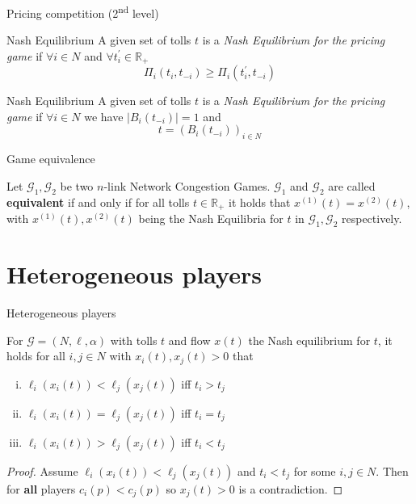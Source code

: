 \documentclass{beamer}
\newcommand{\R}{\mathbb{R}}
\newcommand{\Gm}{\mathcal{G}}
\begin{document}
\begin{frame}{Pricing competition (2\textsuperscript{nd} level)}
	\begin{block}{Nash Equilibrium}
		A given set of tolls $t$ is a \textit{Nash Equilibrium for the pricing game} if $\forall i \in N$ and $\forall t_i^\prime \in \R_+$
		\[\Pi_i(t_i, t_{-i}) \geq \Pi_i(t_i^\prime, t_{-i})\]
	\end{block}
	\begin{block}{Nash Equilibrium}
		A given set of tolls $t$ is a \textit{Nash Equilibrium for the pricing game} if
		$\forall i \in N$ we have $|B_i(t_{-i})| = 1$ and
		\[t = (B_i(t_{-i}))_{i \in N}\]
	\end{block}
\end{frame}

\begin{frame}{Game equivalence}
	\begin{definition}
		Let $\Gm_1, \Gm_2$ be two $n$-link Network Congestion Games.
		$\Gm_1$ and $\Gm_2$ are called \textbf{equivalent} if and only if for all tolls $t \in \R_+$ it holds that $x^{(1)}(t) = x^{(2)}(t)$, with $x^{(1)}(t), x^{(2)}(t)$ being the Nash Equilibria for $t$ in $\Gm_1, \Gm_2$ respectively.
	\end{definition}
\end{frame}


\section{Heterogeneous players}

\begin{frame}{Heterogeneous players}
	\begin{lemma}
		For $\Gm = (N, \ell, \alpha)$ with tolls $t$ and flow $x(t)$ the Nash equilibrium for $t$, it holds for all $i, j \in N$ with $x_i(t), x_j(t) > 0$ that
		\begin{enumerate}[(i)]
			\item $\ell_i(x_i(t)) < \ell_j(x_j(t))$ iff $t_i > t_j$
			\item $\ell_i(x_i(t)) = \ell_j(x_j(t))$ iff $t_i = t_j$
			\item $\ell_i(x_i(t)) > \ell_j(x_j(t))$ iff $t_i < t_j$
		\end{enumerate}
	\end{lemma}
	\begin{proof}
		Assume $\ell_i(x_i(t)) < \ell_j(x_j(t))$ and $t_i < t_j$ for some $i, j \in N$.
		Then for \textbf{all} players $c_i(p) < c_j(p)$ so $x_j(t) > 0$ is a contradiction.
	\end{proof}
\end{frame}
\end{document}
